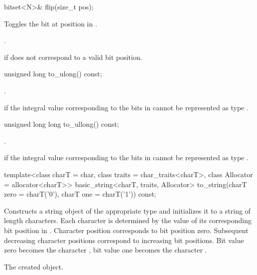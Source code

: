 %
\begin{itemdecl}
bitset<N>& flip(size_t pos);
\end{itemdecl}

\begin{itemdescr}
\pnum
\effects
Toggles the bit at position  in
.

\pnum
\returns
{}.

\pnum
\throws
{}%
 if  does not correspond to a valid bit position.
\end{itemdescr}

%
\begin{itemdecl}
unsigned long to_ulong() const;
\end{itemdecl}

\begin{itemdescr}
\pnum
\returns
{}.

\pnum
\throws
{}%
 if the integral value 
corresponding to the bits in 
cannot be represented as type .
\end{itemdescr}

%
\begin{itemdecl}
unsigned long long to_ullong() const;
\end{itemdecl}

\begin{itemdescr}
\pnum
\returns
{}.

\pnum
\throws
{}%
 if the integral value 
corresponding to the bits in 
cannot be represented as type .
\end{itemdescr}

%
\begin{itemdecl}
template<class charT = char,
         class traits = char_traits<charT>,
         class Allocator = allocator<charT>>
  basic_string<charT, traits, Allocator>
    to_string(charT zero = charT('0'), charT one = charT('1')) const;
\end{itemdecl}

\begin{itemdescr}
\pnum
\effects
Constructs a string object of the appropriate type
and initializes it to a string of length  characters.
Each character is determined by the value of its corresponding bit position in
.
Character position  corresponds to bit position zero.
Subsequent decreasing character positions correspond to increasing bit
positions.
Bit value zero becomes the character ,
bit value one becomes the character
.

\pnum
\returns
The created object.
\end{itemdescr}

